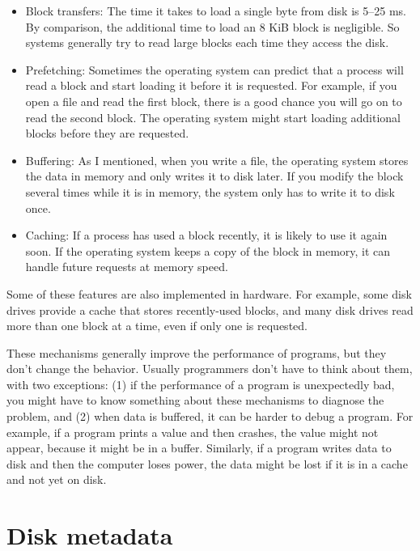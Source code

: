 \documentclass[12pt]{book}
\begin{document}
{\begin{itemize}

\item Block transfers: The time it takes to load a single byte from
  disk is 5--25 ms.  By comparison, the additional time to load an 8
  KiB block is negligible.  So systems generally try to read large
  blocks each time they access the disk.

\item Prefetching: Sometimes the operating system can predict that a
  process will read a block and start loading it before it is
  requested.  For example, if you open a file and read the first
  block, there is a good chance you will go on to read the second
  block.  The operating system might start loading additional blocks
  before they are requested.

\item Buffering: As I mentioned, when you write a file, the operating
  system stores the data in memory and only writes it to disk later.
  If you modify the block several times while it is in memory, the
  system only has to write it to disk once.

\item Caching: If a process has used a block recently, it is likely to
  use it again soon.  If the operating system keeps a copy of the
  block in memory, it can handle future requests at memory speed.

\end{itemize}

Some of these features are also implemented in hardware.  For example,
some disk drives provide a cache that stores recently-used blocks,
and many disk drives read more than one block at a time, even if only
one is requested.

These mechanisms generally improve the performance of
programs, but they don't change the behavior.  Usually programmers
don't have to think about them, with two exceptions: (1) if the
performance of a program is unexpectedly bad, you might have to know
something about these mechanisms to diagnose the problem, and (2)
when data is buffered, it can be harder to debug a program.  For
example, if a program prints a value and then crashes, the value
might not appear, because it might be in a buffer.  Similarly, if a
program writes data to disk and then the computer loses power, the
data might be lost if it is in a cache and not yet on disk.


\section{Disk metadata}

}
\end{document}
